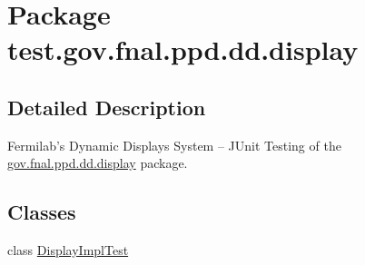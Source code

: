 \hypertarget{namespacetest_1_1gov_1_1fnal_1_1ppd_1_1dd_1_1display}{\section{Package test.\-gov.\-fnal.\-ppd.\-dd.\-display}
\label{namespacetest_1_1gov_1_1fnal_1_1ppd_1_1dd_1_1display}
}


\subsection{Detailed Description}
Fermilab's Dynamic Displays System -- J\-Unit Testing of the \hyperlink{namespacetest_1_1gov_1_1fnal_1_1ppd_1_1dd_1_1display}{gov.\-fnal.\-ppd.\-dd.\-display} package.\subsection*{Classes}
\begin{DoxyCompactItemize}
\item 
class \hyperlink{classtest_1_1gov_1_1fnal_1_1ppd_1_1dd_1_1display_1_1DisplayImplTest}{Display\-Impl\-Test}
\end{DoxyCompactItemize}
